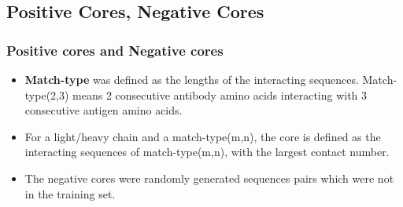 \documentclass[hyperref={pdfpagelabels=false}]{beamer}
\begin{document}
\subsection{Positive Cores, Negative Cores}
\begin{frame}
\frametitle{Positive cores and Negative cores}
\begin{itemize}
	\item \textbf{Match-type} was defined as the lengths of the interacting sequences. Match-type(2,3) means 2 consecutive antibody amino acids interacting with 3 consecutive antigen amino acids.

	\item For a light/heavy chain and a match-type(m,n), the core is defined as the interacting sequences of match-type(m,n), with the largest contact number.
	\item The negative cores were randomly generated sequences pairs which were not in the training set.
\end{itemize}
\end{frame}
	
\end{document}
